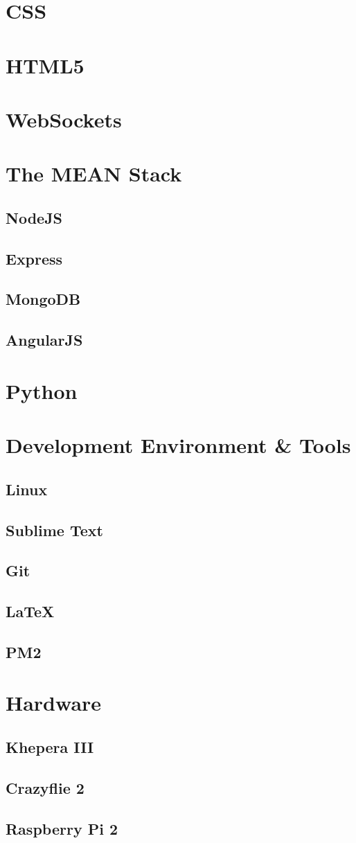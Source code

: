 \section{CSS}
\section{HTML5}
\section{WebSockets}
\section{The MEAN Stack}
\subsection{NodeJS}
\subsection{Express}
\subsection{MongoDB}
\subsection{AngularJS}
\section{Python}
\section{Development Environment \& Tools}
\subsection{Linux}
\subsection{Sublime Text}
\subsection{Git}
\subsection{\LaTeX}
\subsection{PM2}
\section{Hardware}
\subsection{Khepera III}
\subsection{Crazyflie 2}
\subsection{Raspberry Pi 2}
